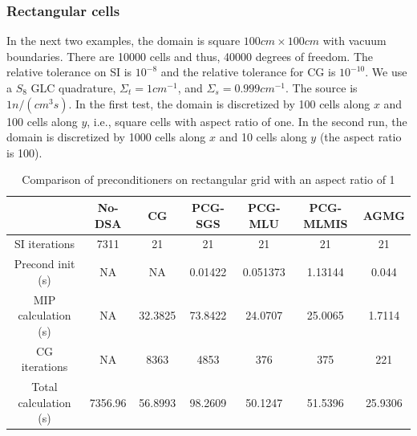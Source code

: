 \subsubsection{Rectangular cells}
 In the next two examples, the domain is square $100cm
\times 100cm$ with vacuum boundaries. There are 10000 cells and thus, 40000
degrees of freedom. The relative tolerance on SI is $10^{-8}$ and the relative
tolerance for CG is $10^{-10}$. We use a $S_8$ GLC quadrature, $\Sigma_t =
1cm^{-1}$, and $\Sigma_s = 0.999cm^{-1}$. The source is $1n/(cm^3s)$. In the
first test, the domain is discretized by 100 cells along $x$ and 100 cells
along $y$, i.e., square cells with aspect ratio of one. In the second run, 
the domain is discretized by 1000 cells along $x$ and 10 cells along $y$ 
(the aspect ratio is 100).
\begin{table}[H]
  \caption{Comparison of preconditioners on rectangular grid with an aspect
  ratio of 1}
  \begin{center}
    \begin{tabular}{|c|c|c|c|c|c|c|}
      \hline
       & No-DSA & CG & PCG-SGS & PCG-MLU & PCG-MLMIS & AGMG \\
      \hline
      SI iterations & 7311      & 21      & 21      & 21       & 21      & 21 \\
   Precond init (s) & NA        & NA      & 0.01422 & 0.051373 & 1.13144 &
      0.044 \\
MIP calculation (s) & NA        & 32.3825 & 73.8422 & 24.0707  & 25.0065 &
      1.7114 \\
      CG iterations & NA        & 8363    & 4853    & 376      & 375     &
      221\\
Total calculation (s) & 7356.96 & 56.8993 & 98.2609 & 50.1247  & 51.5396 &
      25.9306 \\
      \hline
    \end{tabular}
    \label{table_ar_1}
  \end{center}
\end{table}
